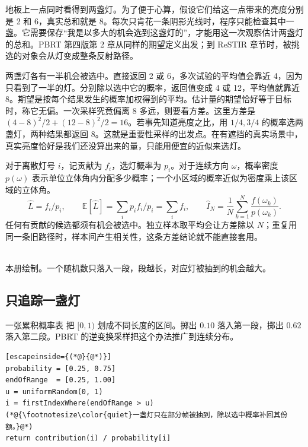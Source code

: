 地板上一点同时看得到两盏灯。为了便于心算，假设它们给这一点带来的亮度分别是 2 和 6，真实总和就是 8。每次只肯花一条阴影光线时，程序只能检查其中一盏。它需要保存“我是以多大的机会选到这盏灯的”，才能用这一次观察估计两盏灯的总和。PBRT 第四版第 2 章从同样的期望定义出发；到 ReSTIR 章节时，被挑选的对象会从灯变成整条反射路径。

两盏灯各有一半机会被选中。直接返回 2 或 6，多次试验的平均值会靠近 4，因为只看到了一半的灯。分别除以选中它的概率，返回值变成 4 或 12，平均值就靠近 8。期望是按每个结果发生的概率加权得到的平均。估计量的期望恰好等于目标时，称它无偏。一次采样究竟偏离 8 多远，则要看方差。这里方差是 $(4-8)^2/2+(12-8)^2/2=16$。若事先知道亮度之比，用 $1/4,3/4$ 的概率选两盏灯，两种结果都返回 8。这就是重要性采样的出发点。在有遮挡的真实场景中，真实亮度恰好是我们还没算出来的量，只能用便宜的近似来选灯。

对于离散灯号 $i$，记贡献为 $f_i$，选灯概率为 $p_i$。对于连续方向 $\omega$，概率密度 $p(\omega)$ 表示单位立体角内分配多少概率；一个小区域的概率近似为密度乘上该区域的立体角。
\[
\widehat L=f_i/p_i,\qquad
\mathbb E[\widehat L]=\sum_i p_i f_i/p_i=\sum_i f_i,\qquad
\widehat I_N=\frac1N\sum_{k=1}^N\frac{f(\omega_k)}{p(\omega_k)}.
\]
任何有贡献的候选都须有机会被选中。独立样本取平均会让方差除以 $N$；重复用同一条旧路径时，样本间产生相关性，这条方差结论就不能直接套用。

\begin{center}\\{\small 本册绘制。一个随机数只落入一段，段越长，对应灯被抽到的机会越大。}\end{center}

\clearpage
\subsection{只追踪一盏灯}
一张累积概率表  把 $[0,1)$ 划成不同长度的区间。掷出 $0.10$ 落入第一段，掷出 $0.62$ 落入第二段。PBRT 的逆变换采样把这个办法推广到连续分布。
\par\nopagebreak
\begin{lstlisting}[escapeinside={(*@}{@*)}]
probability = [0.25, 0.75]
endOfRange  = [0.25, 1.00]
u = uniformRandom(0, 1)
i = firstIndexWhere(endOfRange > u)
(*@{\footnotesize\color{quiet}一盏灯只在部分帧被抽到，除以选中概率补回其份额。}@*)
return contribution(i) / probability[i]
\end{lstlisting}

